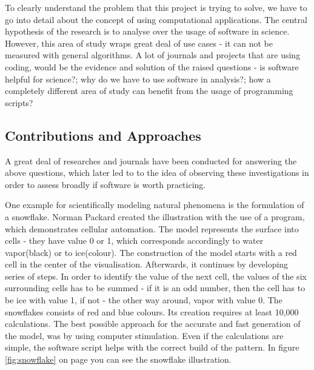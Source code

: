 
To clearly understand the problem that this project is trying to solve, we have to go into detail about the concept of using computational applications. The central hypothesis of the research is to analyse over the usage of software in science. However, this area of study wraps great deal of use cases - it can not be measured with general algorithms. A lot of journals and projects that are using coding, would be the evidence and solution of the raised questions - is software helpful for science?; why do we have to use software in analysis?; how a completely different area of study can benefit from the usage of programming scripts? 

\subsection*{Contributions and Approaches}
\label{sec:contributions}

A great deal of researches and journals have been conducted for answering the above questions, which later led to to the idea of observing these investigations in order to assess broadly if software is worth practicing. 

One example for scientifically modeling natural phenomena is the formulation of a snowflake. Norman Packard created the illustration with the use of a program, which demonstrates cellular automation.\cite{wolfram1984computer}\cite{packard1986lattice} The model represents the surface into cells - they have value 0 or 1, which corresponds accordingly to water vapor(black) or to ice(colour). The construction of the model starts with a red cell in the center of the visualisation. Afterwards, it continues by developing series of steps. In order to identify the value of the next cell, the values of the six surrounding cells has to be summed - if it is an odd number, then the cell has to be ice with value 1, if not - the other way around, vapor with value 0. The snowflakes consists of red and blue colours. Its creation requires at least 10,000 calculations. The best possible approach for the accurate and fast generation of the model, was by using computer stimulation. Even if the calculations are simple, the software script helps with the correct build of the pattern.\cite{wolfram1984computer} In figure \ref{fig:snowflake} on page \pageref{fig:snowflake} you can see the snowflake illustration.

